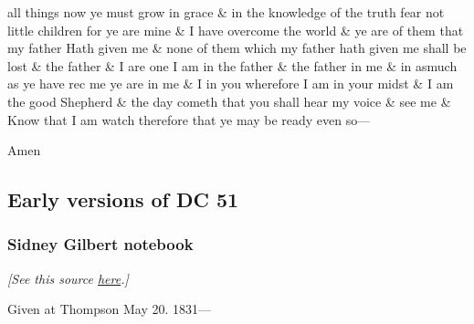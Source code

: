 all things now ye must grow in grace \& in the knowledge of the truth fear not little children for ye are mine \& I have overcome the world \& ye are of them that my father Hath given me \& none of them which my father hath given me shall be lost \& the father \& I are one I am in the father \& the father in me \& in asmuch as ye have rec me ye are in me \& I in you wherefore I am in your midst \& I am the good Shepherd \& the day cometh that you shall hear my voice \& see me \& Know that I am watch therefore that ye may be ready even so---

				\begin{tightright}
					Amen
				\end{tightright}
				
	\subsection{Early versions of DC 51}
		\label{EXSS-DC51-EARLY}
		
			\subsubsection{Sidney Gilbert notebook}
				\label{EXSS-DC51-EARLY-GILBERT}
				
				\textit{[See this source \href{https://www.josephsmithpapers.org/paper-summary/revelation-20-may-1831-as-recorded-in-gilbert-notebook-dc-51/1}{here}.]}
				
				\begin{tightcenter}
					Given at Thompson May 20. 1831---
				\end{tightcenter}
				
